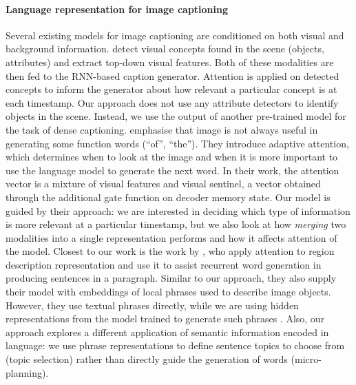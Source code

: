 \documentclass[11pt,a4paper]{article}
\begin{document}
\paragraph{Language representation for image captioning}
Several %
existing models for image captioning are conditioned on both visual and background information.
 detect visual concepts found in the scene (objects, attributes) and extract top-down visual features.
Both of these modalities are then fed to the RNN-based caption generator.
Attention is applied on detected concepts to inform the generator about how relevant a particular concept is at each timestamp.
Our approach does not use any attribute detectors to identify objects in the scene.
Instead, we use the output of another pre-trained model for the task of dense captioning.
 emphasise that image is not always useful in generating some function words (``of'', ``the'').
They introduce adaptive attention, which determines when to look at the image and when it is more important to use the language model to generate the next word.
In their work, the attention vector is a mixture of visual features and visual sentinel, a vector obtained through the additional gate function on decoder memory state.
Our model %
is guided by their approach: we are interested in deciding which type of information is more relevant at a particular timestamp, but we also look at how \textit{merging} two modalities into a single representation performs and how it affects attention of the model.
Closest to our work is the work by , who apply attention to region description representation and use it to assist recurrent word generation in producing sentences in a paragraph.
Similar to our approach, they also supply their model with embeddings of local phrases used to describe image objects.
However, they use textual phrases directly, while we are using hidden representations from the model trained to generate such phrases \cite{densecap}.
Also, our approach explores %
a different application of semantic information encoded in language: we use phrase representations to define sentence topics to choose from (topic selection) rather than directly guide the generation of words (micro-planning).
\end{document}
